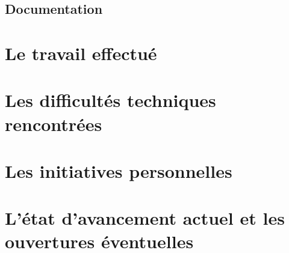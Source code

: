 \documentclass{report}
\begin{document}
\subsection{Documentation}

\section{Le travail effectué}

\section{Les difficultés techniques rencontrées}

\section{Les initiatives personnelles}

\section{L’état d’avancement actuel et les ouvertures éventuelles}
 
\printbibliography
\end{document}
